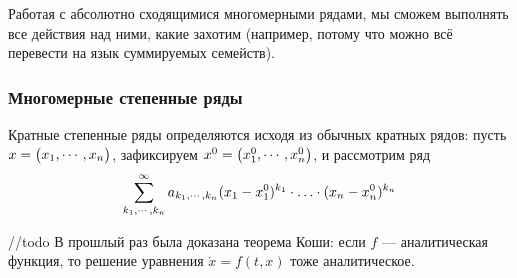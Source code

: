 \documentclass[a4paper]{report}
\begin{document}
    Работая с абсолютно сходящимися многомерными рядами, мы сможем выполнять все действия над ними, какие захотим (например, потому что можно всё перевести на язык суммируемых семейств).
    \subsubsection{Многомерные степенные ряды}
    Кратные степенные ряды определяются исходя из обычных кратных рядов: пусть $x = \begin{pmatrix}x_1, \cdots, x_n\end{pmatrix}$, зафиксируем $x^0 = \begin{pmatrix}x_1^0, \cdots, x_n^0\end{pmatrix}$, и рассмотрим ряд
    \[\sum\limits_{k_1, \cdots, k_n}^{\infty}a_{k_1, \cdots, k_n}(x_1 - x_1^0)^{k_1} \cdot\ldots\cdot (x_n - x_n^0)^{k_n}\]

    //todo
    В прошлый раз была доказана теорема Коши: если $f$ --- аналитическая функция, то решение уравнения $\dot{x} = f(t, x)$ тоже аналитическое.
\end{document}
